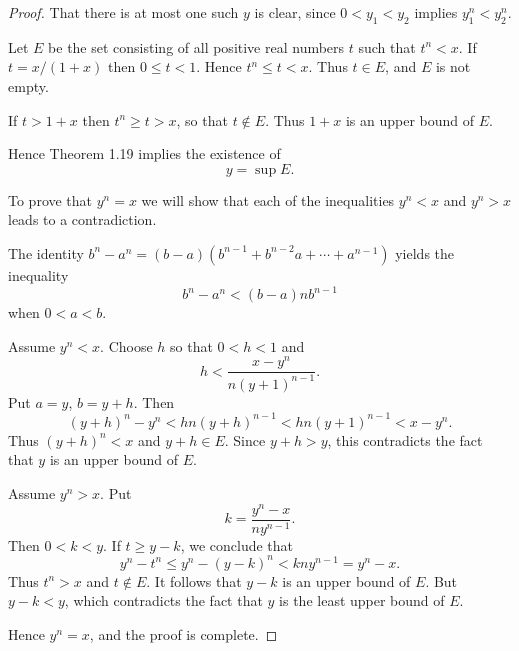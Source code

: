 \documentclass[11pt,twoside]{article}
\begin{document}
\begin{proof}
That there is at most one such $y$ is clear, since $0 < y_1 < y_2$ implies
$y_1^n < y_2^n$.

Let $E$ be the set consisting of all positive real numbers $t$ such that
$t^n < x$. If $t = x/(1+x)$ then $0 \le t < 1$. Hence $t^n \le t < x$. Thus
$t \in E$, and $E$ is not empty.

If $t > 1+x$ then $t^n \ge t > x$, so that $t \notin E$. Thus $1+x$ is an upper
bound of $E$.

Hence Theorem 1.19 implies the existence of
\[ y = \sup E. \]

To prove that $y^n = x$ we will show that each of the inequalities $y^n < x$ and
$y^n > x$ leads to a contradiction.

The identity $b^n - a^n = (b-a)(b^{n-1} + b^{n-2}a + \cdots + a^{n-1})$ yields
the inequality
\[ b^n - a^n < (b-a)nb^{n-1} \]
when $0 < a < b$.

Assume $y^n < x$. Choose $h$ so that $0 < h < 1$ and
\[ h < \frac{x-y^n}{n(y+1)^{n-1}}. \]
Put $a = y$, $b = y+h$. Then
\[ (y+h)^n - y^n < hn(y+h)^{n-1} < hn(y+1)^{n-1} < x - y^n. \]
Thus $(y+h)^n < x$ and $y+h \in E$. Since $y+h > y$, this contradicts the fact
that $y$ is an upper bound of $E$.

Assume $y^n > x$. Put
\[ k = \frac{y^n - x}{ny^{n-1}}. \]
Then $0 < k < y$. If $t \ge y-k$, we conclude that
\[ y^n - t^n \le y^n - (y-k)^n < kny^{n-1} = y^n - x. \]
Thus $t^n > x$ and $t \notin E$. It follows that $y - k$ is an upper bound of
$E$. But $y - k < y$, which contradicts the fact that $y$ is the least upper
bound of $E$.

Hence $y^n = x$, and the proof is complete.
\end{proof}
\end{document}
